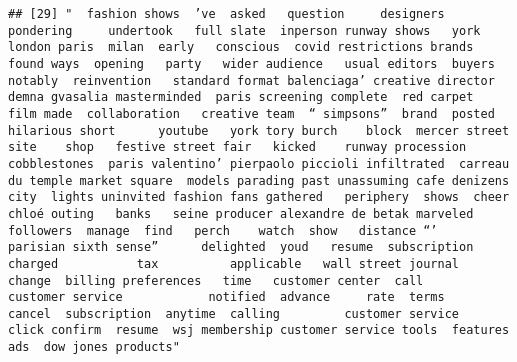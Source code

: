 \documentclass[
]{article}
\begin{document}
\begin{verbatim}
## [29] "  fashion shows  ’ve  asked   question     designers  pondering     undertook   full slate  inperson runway shows   york london paris  milan  early   conscious  covid restrictions brands found ways  opening   party   wider audience   usual editors  buyers   notably  reinvention   standard format balenciaga’ creative director demna gvasalia masterminded  paris screening complete  red carpet   film made  collaboration   creative team  “ simpsons”  brand  posted  hilarious short      youtube   york tory burch    block  mercer street  site    shop   festive street fair   kicked    runway procession   cobblestones  paris valentino’ pierpaolo piccioli infiltrated  carreau du temple market square  models parading past unassuming cafe denizens     city  lights uninvited fashion fans gathered   periphery  shows  cheer   chloé outing   banks   seine producer alexandre de betak marveled   followers  manage  find   perch    watch  show   distance “’     parisian sixth sense”      delighted  youd   resume  subscription    charged           tax          applicable   wall street journal           change  billing preferences   time   customer center  call         customer service            notified  advance     rate  terms           cancel  subscription  anytime  calling         customer service         click confirm  resume  wsj membership customer service tools  features ads  dow jones products"                                                                                                                                                                                                                                                                                                                                                                                                                                                                                                                                                                                                                                                                                                                                                                                                                                                                                                                                                                                                                                                                                                                                                                                                                                                                                                                                                                                                                                                                                                                                                                                                                                                                                                                                                                                                                                                                                                                                                                                 
\end{verbatim}
\end{document}
